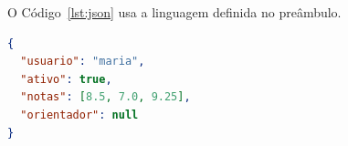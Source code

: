 \documentclass[12pt, a4paper, brazilian]{abntex2}
\begin{document}
O Código~\ref{lst:json} usa a linguagem definida no preâmbulo.

\begin{lstlisting}[language=json, numbers=none,
    caption={Resposta de uma API em JSON, com a linguagem definida pelo
      autor},
    label={lst:json}]
{
  "usuario": "maria",
  "ativo": true,
  "notas": [8.5, 7.0, 9.25],
  "orientador": null
}
\end{lstlisting}
\end{document}

